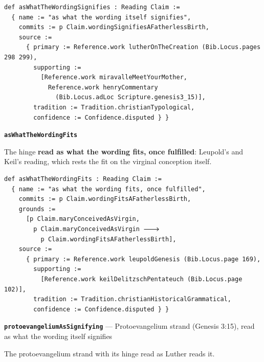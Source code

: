 \documentclass[11pt]{article}
\begin{document}
{\small\begin{verbatim}
def asWhatTheWordingSignifies : Reading Claim :=
  { name := "as what the wording itself signifies",
    commits := p Claim.wordingSignifiesAFatherlessBirth,
    source :=
      { primary := Reference.work lutherOnTheCreation (Bib.Locus.pages 298 299),
        supporting :=
          [Reference.work miravalleMeetYourMother,
            Reference.work henryCommentary
              (Bib.Locus.adLoc Scripture.genesis3_15)],
        tradition := Tradition.christianTypological,
        confidence := Confidence.disputed } }
\end{verbatim}}
\par\medskip\noindent\textbf{\texttt{as\allowbreak{}What\allowbreak{}The\allowbreak{}Wording\allowbreak{}Fits}}\par\nobreak\noindent
The hinge \textbf{read as what the wording fits, once fulfilled}: Leupold’s and Keil’s reading, which rests the fit on the virginal conception itself.

{\small\begin{verbatim}
def asWhatTheWordingFits : Reading Claim :=
  { name := "as what the wording fits, once fulfilled",
    commits := p Claim.wordingFitsAFatherlessBirth,
    grounds :=
      [p Claim.maryConceivedAsVirgin,
        p Claim.maryConceivedAsVirgin 🡒
          p Claim.wordingFitsAFatherlessBirth],
    source :=
      { primary := Reference.work leupoldGenesis (Bib.Locus.page 169),
        supporting :=
          [Reference.work keilDelitzschPentateuch (Bib.Locus.page 102)],
        tradition := Tradition.christianHistoricalGrammatical,
        confidence := Confidence.disputed } }
\end{verbatim}}
\par\medskip\noindent\textbf{\texttt{protoevangelium\allowbreak{}As\allowbreak{}Signifying}} --- Protoevangelium strand (Genesis 3:15), read as what the wording itself signifies\par\nobreak\noindent
The protoevangelium strand with its hinge read as Luther reads it.
\end{document}
